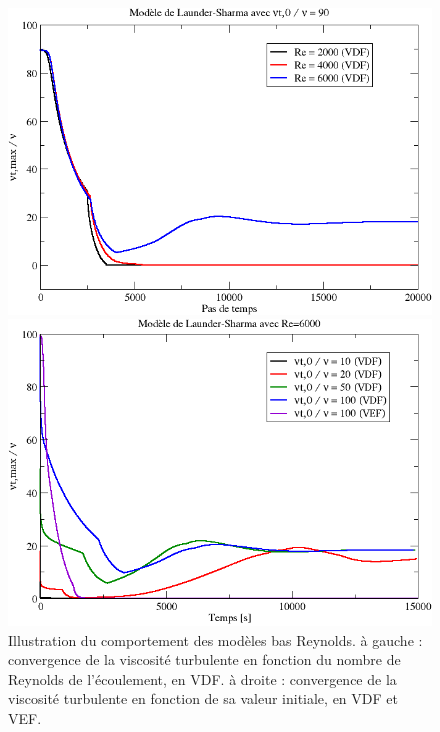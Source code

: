 \begin{itemize}
\begin{figure}[!ht]
\begin{minipage}{0.5\linewidth}
\centering\includegraphics[width=\linewidth]{Figs/nut_max_Reynolds.png}
\end{minipage}
\begin{minipage}{0.5\linewidth}
\centering\includegraphics[width=\linewidth]{Figs/nut_max_VDF_VEF.png}
\end{minipage}
\caption{Illustration du comportement des mod\`eles bas Reynolds. \`a gauche : convergence de la viscosit\'e turbulente en fonction du nombre de Reynolds de l'\'ecoulement, en VDF. \`a droite : convergence de la viscosit\'e turbulente en fonction de sa valeur initiale, en VDF et VEF.}
\label{Fig=Bas_Reynolds}
\end{figure}


\end{itemize}
